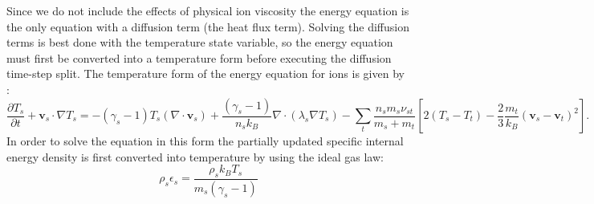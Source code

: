 \documentclass[11pt,letterpaper]{article}
\begin{document}
Since we do not include the effects of physical ion viscosity the energy equation is the only equation with a diffusion term (the heat flux term).  Solving the diffusion terms is best done with the temperature state variable, so the energy equation must first be converted into a temperature form before executing the diffusion time-step split.  The temperature form of the energy equation for ions is given by \citep{Zettergren:2012}:
\begin{equation}
\frac{\partial T_s}{\partial t} + \mathbf{v}_s \cdot \nabla T_s = - \left( \gamma_s - 1 \right) T_s (\nabla \cdot \mathbf{v}_s)  + \frac{\left( \gamma_s - 1 \right)}{ n_s k_B} \nabla \cdot \left( \lambda_s \nabla T_s \right) -\sum_t \frac{n_s m_s \nu_{st}}{m_s + m_t}\left[ 2 (T_s-T_t) - \frac{2}{3} \frac{m_t}{k_B}(\mathbf{v}_s-\mathbf{v}_t)^2 \right]. \label{eqn:entemp}
\end{equation}
In order to solve the equation in this form the partially updated specific internal energy density is first converted into temperature by using the ideal gas law:
\begin{equation}
\rho_s \epsilon_s = \frac{\rho_s k_B T_s}{m_s \left( \gamma_s - 1 \right)}
\end{equation}
\end{document}
